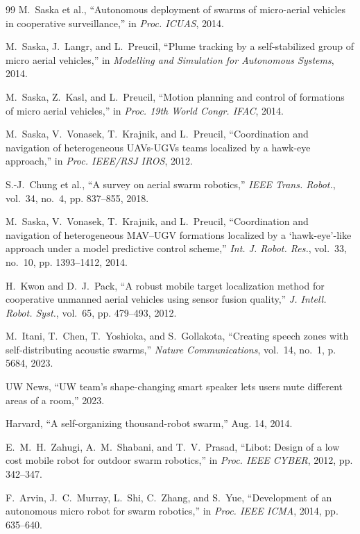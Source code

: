 \documentclass[journal,compsoc]{IEEEtran}
\begin{document}
\begin{thebibliography}{99}
M.~Saska et al., ``Autonomous deployment of swarms of micro-aerial vehicles in cooperative surveillance,'' in \emph{Proc. ICUAS}, 2014.

M.~Saska, J.~Langr, and L.~Preucil, ``Plume tracking by a self-stabilized group of micro aerial vehicles,'' in \emph{Modelling and Simulation for Autonomous Systems}, 2014.

M.~Saska, Z.~Kasl, and L.~Preucil, ``Motion planning and control of formations of micro aerial vehicles,'' in \emph{Proc. 19th World Congr. IFAC}, 2014.

M.~Saska, V.~Vonasek, T.~Krajnik, and L.~Preucil, ``Coordination and navigation of heterogeneous {UAV}s-{UGV}s teams localized by a hawk-eye approach,'' in \emph{Proc. IEEE/RSJ IROS}, 2012.

S.-J.~Chung et al., ``A survey on aerial swarm robotics,'' \emph{IEEE Trans. Robot.}, vol.~34, no.~4, pp. 837--855, 2018.

M.~Saska, V.~Vonasek, T.~Krajnik, and L.~Preucil, ``Coordination and navigation of heterogeneous {MAV}–{UGV} formations localized by a ‘hawk-eye’-like approach under a model predictive control scheme,'' \emph{Int. J. Robot. Res.}, vol.~33, no.~10, pp. 1393--1412, 2014.

H.~Kwon and D.~J.~Pack, ``A robust mobile target localization method for cooperative unmanned aerial vehicles using sensor fusion quality,'' \emph{J. Intell. Robot. Syst.}, vol.~65, pp. 479--493, 2012.

M.~Itani, T.~Chen, T.~Yoshioka, and S.~Gollakota, ``Creating speech zones with self-distributing acoustic swarms,'' \emph{Nature Communications}, vol.~14, no.~1, p. 5684, 2023.

UW News, ``{UW} team's shape-changing smart speaker lets users mute different areas of a room,'' 2023.

Harvard, ``A self-organizing thousand-robot swarm,'' Aug. 14, 2014.

E.~M.~H.~Zahugi, A.~M.~Shabani, and T.~V.~Prasad, ``Libot: Design of a low cost mobile robot for outdoor swarm robotics,'' in \emph{Proc. IEEE CYBER}, 2012, pp. 342--347.

F.~Arvin, J.~C.~Murray, L.~Shi, C.~Zhang, and S.~Yue, ``Development of an autonomous micro robot for swarm robotics,'' in \emph{Proc. IEEE ICMA}, 2014, pp. 635--640.


\end{thebibliography}
\end{document}
